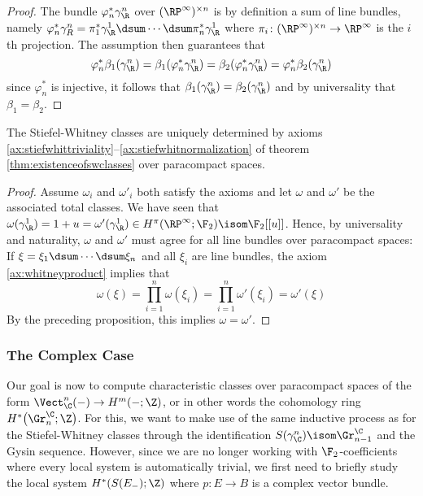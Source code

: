\begin{proof}
	The bundle $\varphi^*_n \gamma_\R^n$ over $(\RP^\infty)^{\times n}$ is by definition a sum of line bundles, namely $\varphi_n^* \gamma_R^n = \pi_1^* \gamma_\R^1 \dsum \cdots \dsum \pi_n^* \gamma_\R^1$ where $\pi_i\colon (\RP^\infty)^{\times n} \to \RP^\infty$ is the $i$th projection.
	The assumption then guarantees that
	\begin{equation*}
		\varphi_n^* \beta_1(\gamma_\R^n) = \beta_1(\varphi_n^* \gamma_\R^n) = \beta_2(\varphi_n^* \gamma_\R^n) = \varphi_n^* \beta_2(\gamma_\R^n)
	\end{equation*}
	since $\varphi_n^*$ is injective, it follows that $\beta_1(\gamma_\R^n) = \beta_2(\gamma_\R^n)$ and by universality that $\beta_1 = \beta_2$.
\end{proof}
\begin{corollary}
	The Stiefel-Whitney classes are uniquely determined by axioms \ref{ax:stiefwhittriviality}--\ref{ax:stiefwhitnormalization} of theorem \ref{thm:existenceofswclasses} over paracompact spaces.
\end{corollary}
\begin{proof}
	Assume $\omega_i$ and $\omega'_i$ both satisfy the axioms and let $\omega$ and $\omega'$ be the associated total classes.
	We have seen that $\omega(\gamma_\R^1) = 1 + u = \omega'(\gamma_\R^1) \in H^\pi(\RP^\infty; \F_2) \isom \F_2[[u]]$.
	Hence, by universality and naturality, $\omega$ and $\omega'$ must agree for all line bundles over paracompact spaces:
	If $\xi = \xi_1 \dsum \cdots \dsum \xi_n$ and all $\xi_i$ are line bundles, the axiom \ref{ax:whitneyproduct} implies that
	\begin{equation*}
		\omega(\xi) = \prod_{i = 1}^n \omega(\xi_i) = \prod_{i = 1}^n \omega'(\xi_i) = \omega'(\xi)
	\end{equation*}
	By the preceding proposition, this implies $\omega = \omega'$.
\end{proof}

\subsubsection{The Complex Case}
Our goal is now to compute characteristic classes over paracompact spaces of the form $\Vect_\C^n({{-}}) \to H^m({{-}}; \Z)$, or in other words the cohomology ring $H^*\big(\Gr^\C_n; \Z\big)$.
For this, we want to make use of the same inductive process as for the Stiefel-Whitney classes through the identification $S(\gamma_\C^n) \isom \Gr^\C_{n - 1}$ and the Gysin sequence.
However, since we are no longer working with $\F_2$-coefficients where every local system is automatically trivial, we first need to briefly study the local system $H^*(S(E_{-}); \Z)$ where $p\colon E \to B$ is a complex vector bundle.

